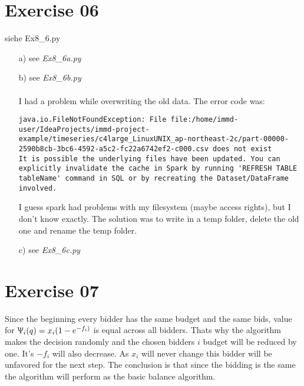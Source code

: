 \documentclass[11pt,a4paper]{scrartcl}
\begin{document}
\section*{Exercise 06}
siehe Ex8\_6.py

\begin{itemize}
\item[a)] see \textit{Ex8\_6a.py}
\item[b)]
see \textit{Ex8\_6b.py}\\\\
I had a problem while overwriting the old data. The error code was:
\begin{lstlisting}
java.io.FileNotFoundException: File file:/home/immd-user/IdeaProjects/immd-project-example/timeseries/c4large_LinuxUNIX_ap-northeast-2c/part-00000-2590b8cb-3bc6-4592-a5c2-fc22a6742ef2-c000.csv does not exist
It is possible the underlying files have been updated. You can explicitly invalidate the cache in Spark by running 'REFRESH TABLE tableName' command in SQL or by recreating the Dataset/DataFrame involved.
\end{lstlisting}
I guess spark had problems with my filesystem (maybe access rights), but I don't know exactly. The solution was to write in a temp folder, delete the old one and rename the temp folder.
\item[c)] see \textit{Ex8\_6c.py}
\end{itemize}

\section*{Exercise 07}

Since the beginning every bidder has the same budget and the same bids, value for $\Uppsi_i(q) = x_i (1 - e^{-f_i)}$ is equal across all bidders. Thats why the algorithm makes the decision randomly and the chosen bidders $i$ budget will be reduced by one. It's $-f_i$ will also decrease. As $x_i$ will never change this bidder will be unfavored for the next step. The conclusion is that since the bidding is the same the algorithm will perform as the basic balance algorithm.
\end{document}
